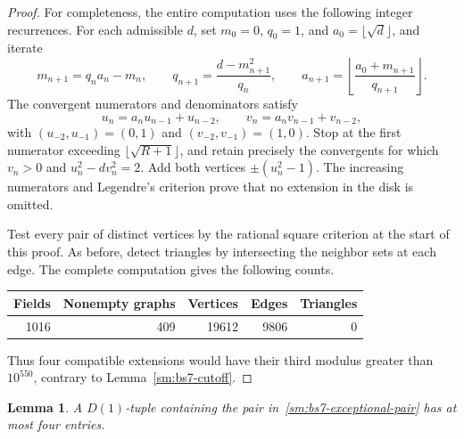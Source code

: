 \documentclass[12pt]{article}
\newtheorem{lemma}[theorem]{Lemma}
\numberwithin{equation}{section}
\begin{document}
\begin{proof}
For completeness, the entire computation uses the following integer recurrences. For each admissible $d$, set $m_0=0$, $q_0=1$, and $a_0=\lfloor\sqrt d\rfloor$, and iterate
\begin{equation*}
 m_{n+1}=q_na_n-m_n,\qquad
 q_{n+1}=\frac{d-m_{n+1}^2}{q_n},\qquad
 a_{n+1}=\left\lfloor\frac{a_0+m_{n+1}}{q_{n+1}}\right\rfloor.
\end{equation*}
The convergent numerators and denominators satisfy
\begin{equation*}
 u_n=a_nu_{n-1}+u_{n-2},\qquad
 v_n=a_nv_{n-1}+v_{n-2},
\end{equation*}
with $(u_{-2},u_{-1})=(0,1)$ and $(v_{-2},v_{-1})=(1,0)$.
Stop at the first numerator exceeding $\lfloor\sqrt{R+1}\rfloor$, and retain precisely the convergents for which $v_n>0$ and $u_n^2-dv_n^2=2$. Add both vertices $\pm(u_n^2-1)$. The increasing numerators and Legendre's criterion prove that no extension in the disk is omitted.

Test every pair of distinct vertices by the rational square criterion at the start of this proof. As before, detect triangles by intersecting the neighbor sets at each edge. The complete computation gives the following counts.
\begin{center}
\begin{tabular}{rrrrr}
\toprule
Fields & Nonempty graphs & Vertices & Edges & Triangles\\
\midrule
1016 &409 &19612 &9806 &0\\
\bottomrule
\end{tabular}
\end{center}
Thus four compatible extensions would have their third modulus greater than $10^{550}$, contrary to Lemma~\ref{sm:bs7-cutoff}.
\end{proof}
\begin{lemma}\label{sm:bs7-eisenstein}
A $D(1)$-tuple containing the pair in~\eqref{sm:bs7-exceptional-pair} has at most four entries.
\end{lemma}
\end{document}
